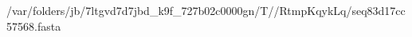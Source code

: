 \documentclass[10pt]{article}
\begin{document}
\begin{texshade}{/var/folders/jb/7ltgvd7d7jbd_k9f_727b02c0000gn/T//RtmpKqykLq/seq83d17cc57568.fasta}
\hideconsensus
{}
\hidelogoscale
{}
\showlegend
\end{texshade}
\end{document}
